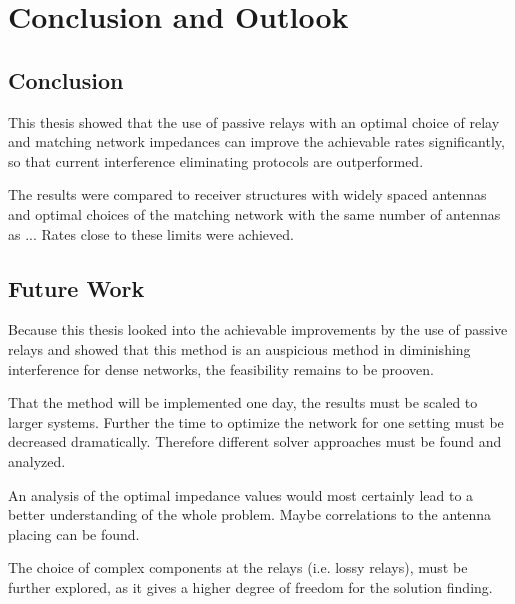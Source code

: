 \chapter{Conclusion and Outlook}

\section{Conclusion}
\label{sec:conclusion}
This thesis showed that the use of passive relays with an optimal choice of relay and matching network impedances can improve the achievable rates significantly, so that current interference eliminating protocols are outperformed.

The results were compared to receiver structures with widely spaced antennas and optimal choices of the matching network with the same number of antennas as ...
Rates close to these limits were achieved.


\section{Future Work}
\label{sec:outlook}
Because this thesis looked into the achievable improvements by the use of passive relays and showed that this method is an auspicious method in diminishing interference for dense networks, the feasibility remains to be prooven.

That the method will be implemented one day, the results must be scaled to larger systems.
Further the time to optimize  the network for one setting must be decreased dramatically.
Therefore different solver approaches must be found and analyzed.

An analysis of the optimal impedance values would most certainly lead to a better understanding of the whole problem.
Maybe correlations to the antenna placing can be found.

The choice of complex components at the relays (i.e. lossy relays), must be further explored, as it gives a higher degree of freedom for the solution finding.

